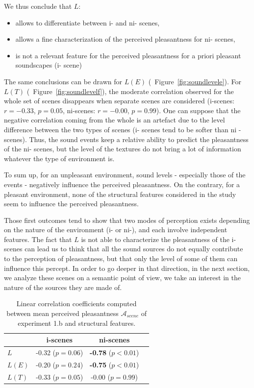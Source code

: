 \documentclass[twoside,twocolumn]{article}
\begin{document}
We thus conclude that $L$:

\begin{itemize}
\item allows to differentiate between i- and ni- scenes,
\item allows a fine characterization of the perceived pleasantness for ni- scenes,
\item is not a relevant feature for the perceived pleasantness for a priori pleasant soundscapes (i- scene)
\end{itemize}

The same conclusions can be drawn for $L(E)$ (\cf~Figure~\ref{fig:soundlevele}). For $L(T)$ (\cf~Figure~\ref{fig:soundlevelf}), the moderate correlation observed for the whole set of scenes disappears when separate scenes are considered (i-scenes: $r=-0.33$, $p=0.05$, ni-scenes: $r=-0.00$, $p=0.99$). One can suppose that the negative correlation coming from the whole is an artefact due to the level difference between the two types of scenes (i- scenes tend to be softer than ni - scenes). Thus, the sound events keep a relative ability to predict the pleasantness of the ni- scenes, but the level of the textures do not bring a lot of information whatever the type of environment is.

To sum up, for an unpleasant environment, sound levels - especially those of the events - negatively influence the perceived pleasantness. On the contrary, for a pleasant environment, none of the structural features considered in the study seem to influence the perceived pleasantness.

Those first outcomes tend to show that two modes of perception exists depending on the nature of the environment (i- or ni-), and each involve independent features. The fact that $L$ is not able to characterize the pleasantness of the i- scenes can lead us to think that all the sound sources do not equally contribute to the perception of pleasantness, but that only the level of some of them can influence this percept. In order to go deeper in that direction, in the next section, we analyze these scenes on a semantic point of view, \ie we take an interest in the nature of the sources they are made of.

\begin{table}[t]
\centering
\begin{tabular}{l c c c}
               & i-scenes                   & ni-scenes    \\
\hline
$L$            & -0.32 ($p=0.06$)           & \textbf{-0.78} ($p<0.01$)\\
$L(E)$         & -0.20 ($p=0.24$)           & \textbf{-0.75} ($p<0.01$)\\
$L(T)$         & -0.33 ($p=0.05$)           &  -0.00 ($p=0.99$) \\
\hline
\end{tabular}
\vspace{0.5mm}
\caption{Linear correlation coefficients computed between mean perceived pleasantness $\mathcal{A}_{scene}$ of experiment 1.b and structural features.}
\label{tab:corrStructA}
\end{table}
\end{document}
